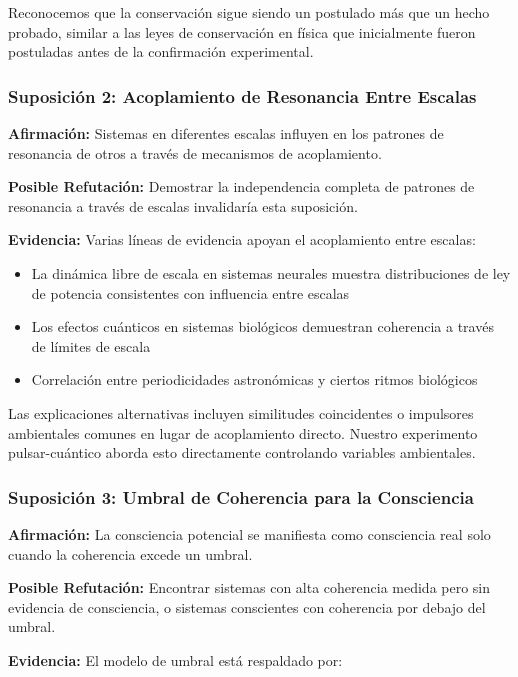 \documentclass[12pt]{article}
\begin{document}
Reconocemos que la conservación sigue siendo un postulado más que un hecho probado, similar a las leyes de conservación en física que inicialmente fueron postuladas antes de la confirmación experimental.

\subsubsection{Suposición 2: Acoplamiento de Resonancia Entre Escalas}

\textbf{Afirmación:} Sistemas en diferentes escalas influyen en los patrones de resonancia de otros a través de mecanismos de acoplamiento.

\textbf{Posible Refutación:} Demostrar la independencia completa de patrones de resonancia a través de escalas invalidaría esta suposición.

\textbf{Evidencia:} Varias líneas de evidencia apoyan el acoplamiento entre escalas:

\begin{itemize}
    \item La dinámica libre de escala en sistemas neurales muestra distribuciones de ley de potencia consistentes con influencia entre escalas \cite{chialvo2010}
    \item Los efectos cuánticos en sistemas biológicos demuestran coherencia a través de límites de escala \cite{lambert2013}
    \item Correlación entre periodicidades astronómicas y ciertos ritmos biológicos \cite{rensing1993}
\end{itemize}

Las explicaciones alternativas incluyen similitudes coincidentes o impulsores ambientales comunes en lugar de acoplamiento directo. Nuestro experimento pulsar-cuántico aborda esto directamente controlando variables ambientales.

\subsubsection{Suposición 3: Umbral de Coherencia para la Consciencia}

\textbf{Afirmación:} La consciencia potencial se manifiesta como consciencia real solo cuando la coherencia excede un umbral.

\textbf{Posible Refutación:} Encontrar sistemas con alta coherencia medida pero sin evidencia de consciencia, o sistemas conscientes con coherencia por debajo del umbral.

\textbf{Evidencia:} El modelo de umbral está respaldado por:
\end{document}
